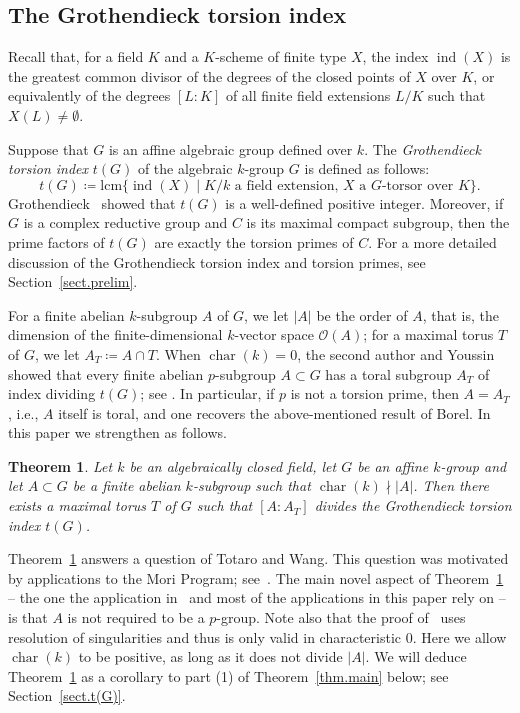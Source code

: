 \documentclass[12pt]{amsart}
\numberwithin{equation}{section}
\newtheorem{theorem}{Theorem}[section]
\theoremstyle{remark}
\newcommand{\ind}{\operatorname{ind}}
\newcommand{\Char}{\operatorname{char}}
\begin{document}
\subsection{The Grothendieck torsion index}

Recall that, for a field $K$ and a $K$-scheme of finite type $X$, the index $\ind(X)$ is the greatest common divisor of the degrees of the closed points of $X$ over $K$, or equivalently of the degrees $[L:K]$ of all finite field extensions $L/K$ such that $X(L) \neq \emptyset$.

Suppose that $G$ is an affine algebraic group defined over $k$. The \emph{Grothendieck torsion index} $t(G)$ of the algebraic $k$-group $G$ is defined as follows: 
\begin{equation}\label{eq:t}
    t(G) \coloneqq \mathrm{lcm}\{\ind(X)\mid \text{$K/k$ a field extension, $X$ a $G$-torsor over $K$}\}.
\end{equation} 
Grothendieck~\cite{grothendieck-special} showed that $t(G)$ is a well-defined positive integer. Moreover, if $G$ is a complex reductive group and $C$ is its maximal compact subgroup, then the prime factors of $t(G)$ are exactly the torsion primes of $C$. For a more detailed discussion of the Grothendieck torsion index and torsion primes, see Section~\ref{sect.prelim}. 

For a finite abelian $k$-subgroup $A$ of $G$, we let $|A|$ be the order of $A$, that is, the dimension of the finite-dimensional $k$-vector space $\mathcal{O}(A)$; for a maximal torus $T$ of $G$, we let $A_T\coloneqq A\cap T$. When $\Char(k)=0$, the second author and Youssin showed that every finite abelian $p$-subgroup $A \subset G$ has a toral subgroup $A_T$ of index dividing $t(G)$; see \cite[Theorem 1.1]{reichstein-youssin2}. In particular, if $p$ is not a torsion prime, then $A = A_T$, i.e., $A$ itself is toral, and one recovers the above-mentioned result of Borel. In this paper we strengthen \cite[Theorem 1.1]{reichstein-youssin2} as follows.

\begin{theorem} \label{thm.t(G)} Let $k$ be an algebraically closed field, let $G$ be an affine $k$-group and let $A \subset G$ be a finite abelian $k$-subgroup such that $\Char(k)\nmid |A|$. Then there exists a maximal torus $T$ of $G$ such that $[A:A_T]$ divides the Grothendieck torsion index $t(G)$.
\end{theorem}

Theorem~\ref{thm.t(G)} answers a question of Totaro and Wang. This question was motivated by applications to the Mori Program; see~\cite{wang-jiahe}. The main novel aspect of Theorem~\ref{thm.t(G)} -- the one the application in~\cite{wang-jiahe} and most of the applications in this paper rely on -- is that $A$ is not required to be a $p$-group.  Note also that the proof of~\cite[Theorem 1.1]{reichstein-youssin2} uses resolution of singularities and thus is only valid in characteristic $0$. Here we allow  $\Char(k)$ to be positive, as long as it does not divide $|A|$. We will deduce Theorem~\ref{thm.t(G)} as a corollary to part (1) of Theorem~\ref{thm.main} below; see Section~\ref{sect.t(G)}.
\end{document}
